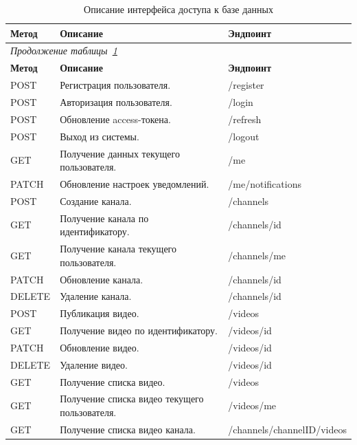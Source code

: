 
\renewcommand{\thetable}{В.\arabic{table}}
\setcounter{table}{0}

\begin{longtable}{|p{1.8cm}|p{7.2cm}|p{6.2cm}|}
    \caption{Описание интерфейса доступа к базе данных}\label{tab:api_endpoints} \\
    \hline
    \textbf{Метод} & \textbf{Описание} & \textbf{Эндпоинт} \\
    \hline
    \endfirsthead
    \multicolumn{3}{l}{\textit{Продолжение таблицы~\ref{tab:api_endpoints}}} \\
    \hline
    \textbf{Метод} & \textbf{Описание} & \textbf{Эндпоинт} \\
    \hline
    \endhead
    \endfoot
    \endlastfoot
    POST & Регистрация пользователя. & /register \\
    \hline
    POST & Авторизация пользователя. & /login \\
    \hline
    POST & Обновление access-токена. & /refresh \\
    \hline
    POST & Выход из системы. & /logout \\
    \hline
    GET & Получение данных текущего пользователя. & /me \\
    \hline
    PATCH & Обновление настроек уведомлений. & /me/notifications \\
    \hline
    POST & Создание канала. & /channels \\
    \hline
    GET & Получение канала по идентификатору. & /channels/{id} \\
    \hline
    GET & Получение канала текущего пользователя. & /channels/me \\
    \hline
    PATCH & Обновление канала. & /channels/{id} \\
    \hline
    DELETE & Удаление канала. & /channels/{id} \\
    \hline
    POST & Публикация видео. & /videos \\
    \hline
    GET & Получение видео по идентификатору. & /videos/{id} \\
    \hline
    PATCH & Обновление видео. & /videos/{id} \\
    \hline
    DELETE & Удаление видео. & /videos/{id} \\
    \hline
    GET & Получение списка видео. & /videos \\
    \hline
    GET & Получение списка видео текущего пользователя. & /videos/me \\
    \hline
    GET & Получение списка видео канала. & /channels/{channelID}/videos \\

\end{longtable}
